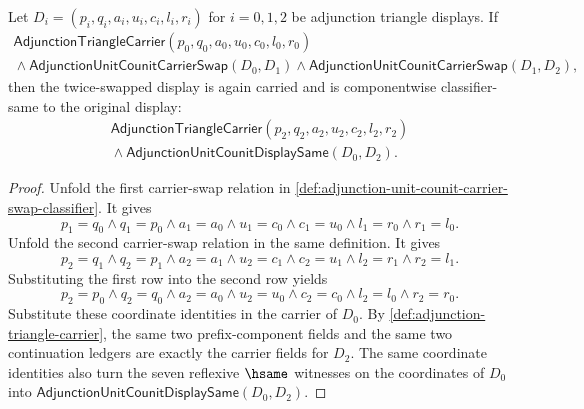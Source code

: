 \begin{theorem}
\label{thm:adjunction-triangle-carrier-swap-involution}
Let $D_i=(p_i,q_i,a_i,u_i,c_i,l_i,r_i)$ for $i=0,1,2$ be adjunction triangle displays. If
$$
\begin{array}{l}
\mathsf{AdjunctionTriangleCarrier}(p_0,q_0,a_0,u_0,c_0,l_0,r_0)\\
{}\land \mathsf{AdjunctionUnitCounitCarrierSwap}(D_0,D_1)
\land \mathsf{AdjunctionUnitCounitCarrierSwap}(D_1,D_2),
\end{array}
$$
then the twice-swapped display is again carried and is componentwise classifier-same to the original display:
$$
\begin{array}{l}
\mathsf{AdjunctionTriangleCarrier}(p_2,q_2,a_2,u_2,c_2,l_2,r_2)\\
{}\land \mathsf{AdjunctionUnitCounitDisplaySame}(D_0,D_2).
\end{array}
$$
\end{theorem}
\begin{proof}
Unfold the first carrier-swap relation in \autoref{def:adjunction-unit-counit-carrier-swap-classifier}. It gives
$$
p_1=q_0\land q_1=p_0\land a_1=a_0\land u_1=c_0\land c_1=u_0\land l_1=r_0\land r_1=l_0.
$$
Unfold the second carrier-swap relation in the same definition. It gives
$$
p_2=q_1\land q_2=p_1\land a_2=a_1\land u_2=c_1\land c_2=u_1\land l_2=r_1\land r_2=l_1.
$$
Substituting the first row into the second row yields
$$
p_2=p_0\land q_2=q_0\land a_2=a_0\land u_2=u_0\land c_2=c_0\land l_2=l_0\land r_2=r_0.
$$
Substitute these coordinate identities in the carrier of $D_0$. By \autoref{def:adjunction-triangle-carrier}, the same two prefix-component fields and the same two continuation ledgers are exactly the carrier fields for $D_2$. The same coordinate identities also turn the seven reflexive $\hsame$ witnesses on the coordinates of $D_0$ into $\mathsf{AdjunctionUnitCounitDisplaySame}(D_0,D_2)$.
\end{proof}

